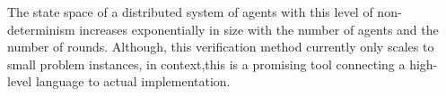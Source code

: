   The state space of a distributed system of agents with this level of non-determinism increases exponentially in size with the number of agents and the number of rounds. Although, this verification method currently only scales to small problem instances, in context,this is a promising tool connecting a high-level language to actual implementation.





 



